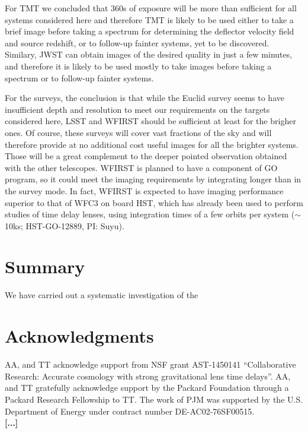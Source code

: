 \documentclass[a4paper,11pt]{article}
\begin{document}
For TMT we concluded that 360s of exposure will be more than
sufficient for all systems considered here and therefore TMT is likely
to be used either to take a brief image before taking a spectrum for
determining the deflector velocity field and source redshift, or to
follow-up fainter systems, yet to be discovered. Similary, JWST can
obtain images of the desired quality in just a few minutes, and
therefore it is likely to be used mostly to take images before taking
a spectrum or to follow-up fainter systems.

For the surveys, the conclusion is that while the Euclid survey seems
to have insufficient depth and resolution to meet our requirements on
the targets considered here, LSST and WFIRST should be sufficient at
least for the brigher ones. Of course, these surveys will cover vast
fractions of the sky and will therefore provide at no additional cost
useful images for all the brighter systems. Those will be a great
complement to the deeper pointed observation obtained with the other
telescopes. WFIRST is planned to have a component of GO program, so it
could meet the imaging requirements by integrating longer than in the
survey mode. In fact, WFIRST is expected to have imaging performance
superior to that of WFC3 on board HST, which has already been used to
perform studies of time delay lenses, using integration times of a few
orbits per system ($\sim$10ks; HST-GO-12889, PI: Suyu).

\section{Summary}

We have carried out a systematic investigation of the 

\section*{Acknowledgments}

AA, and TT acknowledge support from NSF grant AST-1450141 ``Collaborative
Research: Accurate cosmology with strong gravitational lens time
delays''. AA, and TT gratefully acknowledge support by the
Packard Foundation through a Packard Research Fellowship to TT.
The work of PJM was supported by the U.S.  Department of Energy under
contract number DE-AC02-76SF00515.\\
\textbf{[...]}







\end{document}
